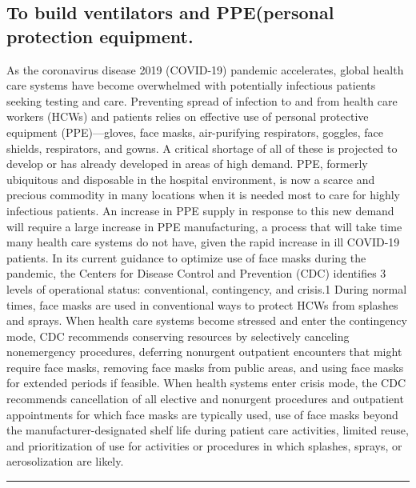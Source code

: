 \documentclass[12pt, letterpaper]{article}
\begin{document}
\begin{center}
\section{To build ventilators and PPE(personal protection equipment.}
As the coronavirus disease 2019 (COVID-19) pandemic accelerates, global health care systems have become overwhelmed with potentially infectious patients seeking testing and care. Preventing spread of infection to and from health care workers (HCWs) and patients relies on effective use of personal protective equipment (PPE)—gloves, face masks, air-purifying respirators, goggles, face shields, respirators, and gowns. A critical shortage of all of these is projected to develop or has already developed in areas of high demand. PPE, formerly ubiquitous and disposable in the hospital environment, is now a scarce and precious commodity in many locations when it is needed most to care for highly infectious patients. An increase in PPE supply in response to this new demand will require a large increase in PPE manufacturing, a process that will take time many health care systems do not have, given the rapid increase in ill COVID-19 patients.
In its current guidance to optimize use of face masks during the pandemic, the Centers for Disease Control and Prevention (CDC) identifies 3 levels of operational status: conventional, contingency, and crisis.1 During normal times, face masks are used in conventional ways to protect HCWs from splashes and sprays. When health care systems become stressed and enter the contingency mode, CDC recommends conserving resources by selectively canceling nonemergency procedures, deferring nonurgent outpatient encounters that might require face masks, removing face masks from public areas, and using face masks for extended periods if feasible.
When health systems enter crisis mode, the CDC recommends cancellation of all elective and nonurgent procedures and outpatient appointments for which face masks are typically used, use of face masks beyond the manufacturer-designated shelf life during patient care activities, limited reuse, and prioritization of use for activities or procedures in which splashes, sprays, or aerosolization are likely. 
\rule{\textwidth}{0.5pt}

\end{center}
\end{document}
